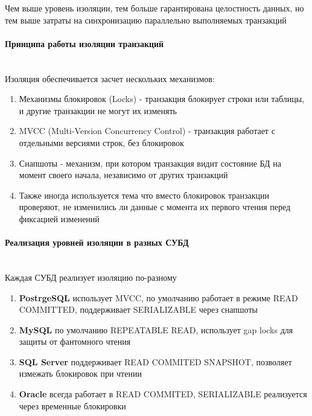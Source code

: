  Чем выше уровень изоляции, тем больше гарантирована целостность данных, но тем выше затраты на синхронизацию параллельно выполняемых транзакций

 \paragraph{Принципа работы изоляции транзакций} ~\\

 Изоляция обеспечивается засчет нескольких механизмов:
 \begin{enumerate}
     \item Механизмы блокировок (Locks) - транзакция блокирует строки или таблицы, и другие транзакции не могут их изменять
     \item MVCC (Multi-Version Concurrency Control) - транзакция работает с отдельными версиями строк, без блокировок
     \item Снапшоты - механизм, при котором транзакция видит состояние БД на момент своего начала, независимо от других транзакций
     \item Также иногда используется тема что вместо блокировок транзакции проверяют, не изменились ли данные с момента их первого чтения перед фиксацией изменений
 \end{enumerate}
 
 \paragraph{Реализация уровней изоляции в разных СУБД} ~\\
 
 Каждая СУБД реализует изоляцию по-разному \autocites[§2]{PostgreSQLdocc13}[§17.7.2.1]{Mysqldoc4}{MicrosoftLearnSQLserverIsolation}{oracledbdoc5}
 
 \begin{enumerate}
     \item \textbf{PostrgeSQL} использует MVCC, по умолчанию работает в режиме READ COMMITTED, поддерживает SERIALIZABLE через снапшоты
     \item \textbf{MySQL} по умолчанию REPEATABLE READ, использует gap locks для защиты от фантомного чтения
     \item \textbf{SQL Server} поддерживает READ COMMITED SNAPSHOT, позволяет измежать блокировок при чтении
     \item \textbf{Oracle} всегда работает в READ COMMITED, SERIALIZABLE реализуется через временные блокировки
 \end{enumerate}
 
